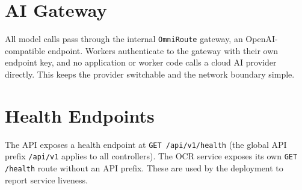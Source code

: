 \section{AI Gateway}

\noindent All model calls pass through the internal \texttt{OmniRoute}
gateway, an OpenAI-compatible endpoint. Workers authenticate to the gateway
with their own endpoint key, and no application or worker code calls a cloud
AI provider directly. This keeps the provider switchable and the network
boundary simple.

\section{Health Endpoints}

\noindent The API exposes a health endpoint at
\texttt{GET /api/v1/health} (the global API prefix \texttt{/api/v1} applies to
all controllers). The OCR service exposes its own \texttt{GET /health} route
without an API prefix. These are used by the deployment to report service
liveness.
